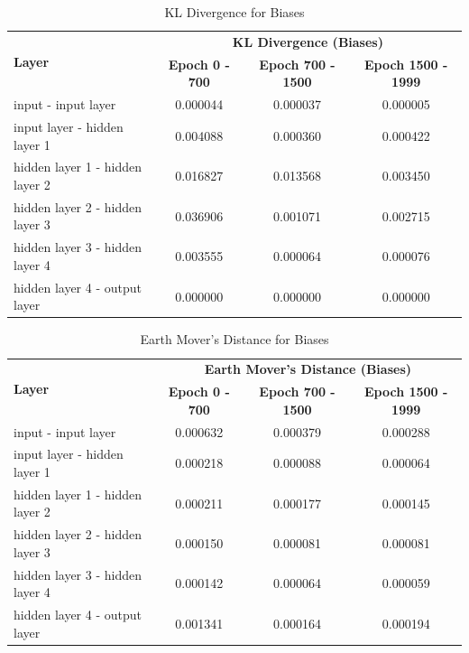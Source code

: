 \documentclass{ioereport}
\begin{document}
    \begin{table}[H]
    \centering
    \begin{tabular}{|l|c|c|c|}
    \hline
    \multirow{2}{*}{\textbf{Layer}} & \multicolumn{3}{|c|}{\textbf{KL Divergence (Biases)}} \\
    \cline{2-4}
    & \textbf{Epoch 0 - 700} & \textbf{Epoch 700 - 1500} & \textbf{Epoch 1500 - 1999} \\
    \hline
    input - input layer & 0.000044 & 0.000037 & 0.000005 \\
    input layer - hidden layer 1 & 0.004088 & 0.000360 & 0.000422 \\
    hidden layer 1 - hidden layer 2 & 0.016827 & 0.013568 & 0.003450 \\
    hidden layer 2 - hidden layer 3 & 0.036906 & 0.001071 & 0.002715 \\
    hidden layer 3 - hidden layer 4 & 0.003555 & 0.000064 & 0.000076 \\
    hidden layer 4 - output layer & 0.000000 & 0.000000 & 0.000000 \\
    \hline
    \end{tabular}
    \caption{KL Divergence for Biases}
    \end{table}
    
    \begin{table}[H]
    \centering
    \begin{tabular}{|l|c|c|c|}
    \hline
    \multirow{2}{*}{\textbf{Layer}} & \multicolumn{3}{|c|}{\textbf{Earth Mover's Distance (Biases)}} \\
    \cline{2-4}
    & \textbf{Epoch 0 - 700} & \textbf{Epoch 700 - 1500} & \textbf{Epoch 1500 - 1999} \\
    \hline
    input - input layer & 0.000632 & 0.000379 & 0.000288 \\
    input layer - hidden layer 1 & 0.000218 & 0.000088 & 0.000064 \\
    hidden layer 1 - hidden layer 2 & 0.000211 & 0.000177 & 0.000145 \\
    hidden layer 2 - hidden layer 3 & 0.000150 & 0.000081 & 0.000081 \\
    hidden layer 3 - hidden layer 4 & 0.000142 & 0.000064 & 0.000059 \\
    hidden layer 4 - output layer & 0.001341 & 0.000164 & 0.000194 \\
    \hline
    \end{tabular}
    \caption{Earth Mover's Distance for Biases}
    \end{table}
\end{document}
